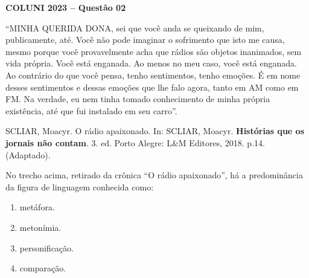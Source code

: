 \textbf{COLUNI 2023 -- Questão 02}\par\medskip “MINHA QUERIDA DONA, sei que você anda se queixando de mim, publicamente, até. Você não pode imaginar o sofrimento que isto me causa, mesmo porque você provavelmente acha que rádios são objetos inanimados, sem vida própria. Você está enganada. Ao menos no meu caso, você está enganada. Ao contrário do que você pensa, tenho sentimentos, tenho emoções. É em nome desses sentimentos e dessas emoções que lhe falo agora, tanto em AM como em FM. Na verdade, eu nem tinha tomado conhecimento de minha própria existência, até que fui instalado em seu carro”.

\par

SCLIAR, Moacyr. O rádio apaixonado. In: SCLIAR, Moacyr. \textbf{Histórias que os jornais não contam}. 3. ed. Porto Alegre: L\&M Editores, 2018. p.14. (Adaptado).

\par

No trecho acima, retirado da crônica “O rádio apaixonado”, há a predominância da figura de linguagem conhecida como:\begin{enumerate}
\item metáfora.
\item metonímia.
\item personificação.
\item comparação.\end{enumerate}
